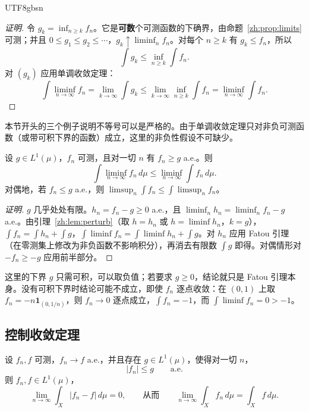 \documentclass[11pt]{article}
\makeatletter
\newcommand{\envlabel}[1]{\protected@edef\@currentlabel{\themathenv}\label{#1}}
\makeatother
\begin{document}
\begin{CJK*}{UTF8}{gbsn}
\begin{proof}[证明]
令 $g_{k}=\inf_{n\geq k}f_{n}$。它是\textbf{可数}个可测函数的下确界，由命题~\ref{zh:prop:limits} 可测；并且 $0\leq g_{1}\leq g_{2}\leq\cdots$，$g_{k}\uparrow\liminf_{n}f_{n}$。对每个 $n\geq k$ 有 $g_{k}\leq f_{n}$，所以
\[
\int g_{k}\leq\inf_{n\geq k}\int f_{n}.
\]
对 $(g_{k})$ 应用单调收敛定理：
\[
\int\liminf_{n\to\infty}f_{n}=\lim_{k\to\infty}\int g_{k}\leq\lim_{k\to\infty}\inf_{n\geq k}\int f_{n}=\liminf_{n\to\infty}\int f_{n}.
\]
\end{proof}

本节开头的三个例子说明不等号可以是严格的。由于单调收敛定理只对非负可测函数（或带可积下界的函数）成立，这里的非负性假设不可缺少。

\begin{corollary}\envlabel{zh:cor:fatougen}
设 $g\in L^{1}(\mu)$，$f_{n}$ 可测，且对一切 $n$ 有 $f_{n}\geq g$ a.e.。则
\[
\int\liminf_{n\to\infty}f_{n}\,d\mu\leq\liminf_{n\to\infty}\int f_{n}\,d\mu.
\]
对偶地，若 $f_{n}\leq g$ a.e.，则 $\limsup_{n}\int f_{n}\leq\int\limsup_{n}f_{n}$。
\end{corollary}

\begin{proof}[证明]
$g$ 几乎处处有限。$h_{n}=f_{n}-g\geq0$ a.e.，且 $\liminf_{n}h_{n}=\liminf_{n}f_{n}-g$ a.e.。由引理~\ref{zh:lem:perturb}（取 $h=h_{n}$ 或 $h=\liminf h_{n}$，$k=g$），$\int f_{n}=\int h_{n}+\int g$，$\int\liminf f_{n}=\int\liminf h_{n}+\int g$。对 $h_{n}$ 应用 Fatou 引理（在零测集上修改为非负函数不影响积分），再消去有限数 $\int g$ 即得。对偶情形对 $-f_{n}\geq-g$ 应用前半部分。
\end{proof}

\begin{remark}
这里的下界 $g$ 只需可积，可以取负值；若要求 $g\geq0$，结论就只是 Fatou 引理本身。没有可积下界时结论可能不成立，即使 $f_{n}$ 逐点收敛：在 $(0,1)$ 上取 $f_{n}=-n\mathbf{1}_{(0,1/n)}$，则 $f_{n}\to0$ 逐点成立，$\int f_{n}=-1$，而 $\int\liminf f_{n}=0>-1$。
\end{remark}

\subsection{控制收敛定理}

\begin{theorem}\envlabel{zh:thm:dct}
设 $f_{n},f$ 可测，$f_{n}\to f$ a.e.，并且存在 $g\in L^{1}(\mu)$，使得对一切 $n$，
\[
|f_{n}|\leq g\qquad\text{a.e.}
\]
则 $f_{n},f\in L^{1}(\mu)$，
\[
\lim_{n\to\infty}\int_{X}|f_{n}-f|\,d\mu=0,\qquad\text{从而}\qquad\lim_{n\to\infty}\int_{X}f_{n}\,d\mu=\int_{X}f\,d\mu.
\]
\end{theorem}


\end{CJK*}
\end{document}

